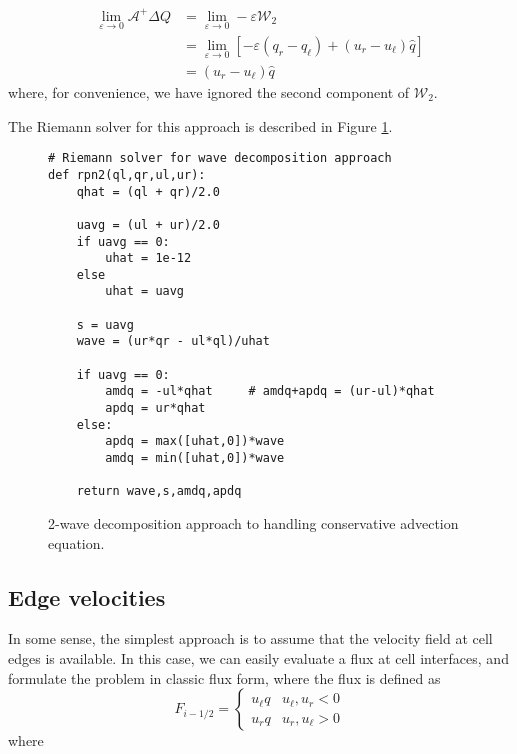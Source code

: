 \documentclass{article}
\newcommand{\Fig}[1]{Figure \ref{fig:#1}}
\begin{document}
\begin{align}
\lim_{\varepsilon \rightarrow 0} \mathcal A^+ \Delta Q
& = \lim_{\varepsilon \rightarrow 0} -\varepsilon \mathcal W_2 \\
& = \lim_{\varepsilon \rightarrow 0} \left[-\varepsilon(q_r - q_\ell) + (u_r - u_\ell) \widehat{q}\right] \\
& = (u_r - u_\ell) \widehat{q}
\end{align}
where, for convenience, we have ignored the second component of $\mathcal W_2$. 

The Riemann solver for this approach is described in \Fig{wave_decomp}.


\begin{figure}
\begin{center}
\begin{minipage}{0.5\textwidth}
\vspace{0.25cm}
\begin{verbatim}
# Riemann solver for wave decomposition approach
def rpn2(ql,qr,ul,ur):
    qhat = (ql + qr)/2.0

    uavg = (ul + ur)/2.0      
    if uavg == 0:
        uhat = 1e-12
    else
        uhat = uavg

    s = uavg
    wave = (ur*qr - ul*ql)/uhat

    if uavg == 0:
        amdq = -ul*qhat     # amdq+apdq = (ur-ul)*qhat
        apdq = ur*qhat
    else:
        apdq = max([uhat,0])*wave
        amdq = min([uhat,0])*wave        

    return wave,s,amdq,apdq
\end{verbatim}
\end{minipage}
\end{center}
\caption{2-wave decomposition approach to handling conservative advection equation.}
\label{fig:wave_decomp}
\end{figure}

\vspace{0.25cm}

\subsection{Edge velocities}
In some sense, the simplest approach is to assume that the velocity field at cell edges is available. 
In this case, we can easily evaluate a flux at cell interfaces, and formulate the problem 
in classic flux form, where the flux is defined as
\begin{equation*}
F_{i-1/2} = \left\{\begin{array}{cc} 
u_\ell q & u_\ell, u_r < 0 \\
u_r q & u_r, u_\ell > 0
\end{array}
\right.
\end{equation*}
where
\end{document}
